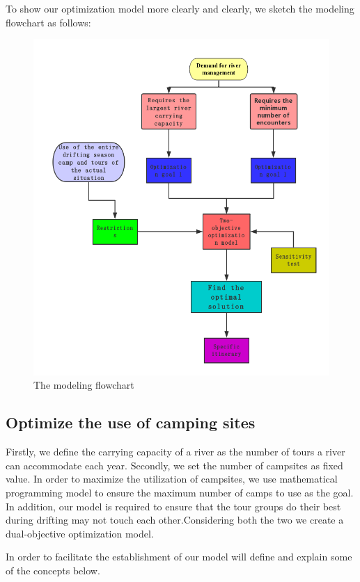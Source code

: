 \par To show our optimization model more clearly and clearly, we sketch the modeling flowchart as follows:
\begin{figure}[H]
	\centering
	\includegraphics[width=0.7\linewidth]{figures/flowchart}
	\caption{The modeling flowchart}
	\label{fig:flowchart}
\end{figure}

  
\subsection{Optimize the use of camping sites}
\label{subsection:5.1subsection}
\noindent 
Firstly, we define the carrying capacity of a river as the number of tours a river can accommodate each year. Secondly, we set the number of campsites as fixed value. In order to maximize the utilization of campsites, we use mathematical programming model to ensure the maximum number of camps to use as the goal. In addition, our model is required to ensure that the tour groups do their best during drifting may not touch each other.Considering both the two we create a dual-objective optimization model.
\par In order to facilitate the establishment of our model will define and explain some of the concepts below.

